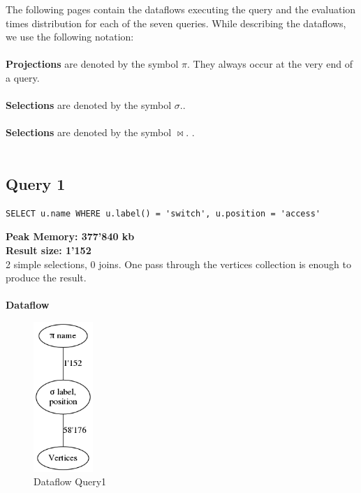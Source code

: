 \documentclass[11pt,singlecolumn]{scrartcl}
\begin{document}
The following pages contain the dataflows executing the query and the evaluation times distribution for each of the seven queries. While describing the dataflows, we use the following notation:\\\\
\textbf{Projections} are denoted by the symbol \(\pi\). They always occur at the very end of a query.\\\\
\textbf{Selections} are denoted by the symbol \(\sigma\)..\\\\
\textbf{Selections} are denoted by the symbol \(\bowtie\).  .\\\\

\clearpage

\subsection{Query 1}
\begin{verbatim}
SELECT u.name WHERE u.label() = 'switch', u.position = 'access'
\end{verbatim}
\textbf{Peak Memory: 377'840 kb}\\
\textbf{Result size: 1'152} \\
2 simple selections, 0 joins. One pass through the vertices collection is enough to produce the result.\\\\
\textbf{Dataflow}
\begin{figure}[H]
\includegraphics[width=0.2\textwidth]{graph1}
\caption{Dataflow Query1}
\end{figure}
\clearpage
\end{document}
